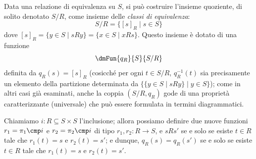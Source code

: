 Data una relazione di equivalenza su \(S\), si può costruire l'insieme quoziente, di solito denotato \(S/R\), come insieme delle \emph{classi di equivalenza}:
\[
	S/R=\{[s]_R\mid s\in S\}
\]
dove \([s]_R=\{y\in S\mid sRy\}=\{x\in S\mid xRs\}\). Questo insieme è dotato di una funzione
\[\dmFun{q_R}{S}{S/R}\]
definita da \(q_R(s)=[s]_R\) (cosicché per ogni \(t\in S/R\), \(q_R^{-1}(t)\) sia precisamente un elemento della partizione determinata da \(\{\{y\in S\mid sRy\}\mid y\in S\}\)); come in altri casi già esaminati, anche la
coppia \((S/R, q_R)\) gode di una proprietà caratterizzante (universale) che può essere formulata in termini diagrammatici.

Chiamiamo \(i\colon R\subseteq S\times S\) l'inclusione; allora possiamo definire due nuove funzioni \(r_1=\pi_1\cmp i\) e \(r_2=\pi_2\cmp i\) di tipo \(r_1,r_2\colon R\to S\), e \(s R s'\) se e solo se esiste \(t\in R\) tale che \(r_1(t)=s\) e \(r_2(t)=s'\); e dunque, \(q_R(s)=q_R(s')\) se e solo se esiste \(t\in R\) tale che \(r_1(t)=s\) e \(r_2(t)=s'\).

